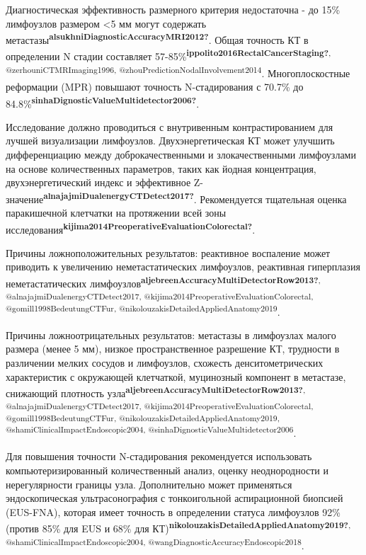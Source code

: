 \documentclass[
  russian,
  12pt,
  a4paper,
]{report}
\begin{document}
Диагностическая эффективность размерного критерия недостаточна - до 15\%
лимфоузлов размером \textless5 мм могут содержать
метастазы\textsuperscript{\textbf{alsukhniDiagnosticAccuracyMRI2012?}}.
Общая точность КТ в определении N стадии составляет
57-85\%\textsuperscript{\textbf{ippolito2016RectalCancerStaging?},
@zerhouniCTMRImaging1996, @zhouPredictionNodalInvolvement2014}.
Многоплоскостные реформации (MPR) повышают точность N-стадирования с
70.7\% до
84.8\%\textsuperscript{\textbf{sinhaDignosticValueMultidetector2006?}}.

Исследование должно проводиться с внутривенным контрастированием для
лучшей визуализации лимфоузлов. Двухэнергетическая КТ может улучшить
дифференциацию между доброкачественными и злокачественными лимфоузлами
на основе количественных параметров, таких как йодная концентрация,
двухэнергетический индекс и эффективное
Z-значение\textsuperscript{\textbf{alnajajmiDualenergyCTDetect2017?}}.
Рекомендуется тщательная оценка паракишечной клетчатки на протяжении
всей зоны
исследования\textsuperscript{\textbf{kijima2014PreoperativeEvaluationColorectal?}}.

Причины ложноположительных результатов: реактивное воспаление может
приводить к увеличению неметастатических лимфоузлов, реактивная
гиперплазия неметастатических
лимфоузлов\textsuperscript{\textbf{aljebreenAccuracyMultiDetectorRow2013?},
@alnajajmiDualenergyCTDetect2017,
@kijima2014PreoperativeEvaluationColorectal, @gomill1998BedeutungCTFur,
@nikolouzakisDetailedAppliedAnatomy2019}.

Причины ложноотрицательных результатов: метастазы в лимфоузлах малого
размера (менее 5 мм), низкое пространственное разрешение КТ, трудности в
различении мелких сосудов и лимфоузлов, схожесть денситометрических
характеристик с окружающей клетчаткой, муцинозный компонент в метастазе,
снижающий плотность
узла\textsuperscript{\textbf{aljebreenAccuracyMultiDetectorRow2013?},
@alnajajmiDualenergyCTDetect2017,
@kijima2014PreoperativeEvaluationColorectal, @gomill1998BedeutungCTFur,
@nikolouzakisDetailedAppliedAnatomy2019,
@shamiClinicalImpactEndoscopic2004,
@sinhaDignosticValueMultidetector2006}.

Для повышения точности N-стадирования рекомендуется использовать
компьютеризированный количественный анализ, оценку неоднородности и
нерегулярности границы узла. Дополнительно может применяться
эндоскопическая ультрасонография с тонкоигольной аспирационной биопсией
(EUS-FNA), которая имеет точность в определении статуса лимфоузлов 92\%
(против 85\% для EUS и 68\% для
КТ)\textsuperscript{\textbf{nikolouzakisDetailedAppliedAnatomy2019?},
@shamiClinicalImpactEndoscopic2004,
@wangDiagnosticAccuracyEndoscopic2018}.
\end{document}
